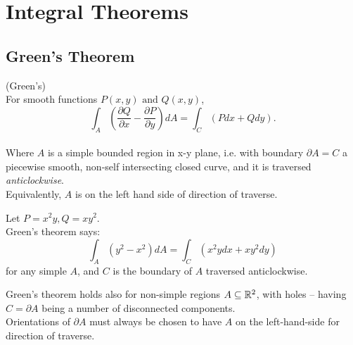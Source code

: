 \documentclass[a4paper]{article}
\begin{document}
\newpage

\section{Integral Theorems}
\subsection{Green's Theorem}
\begin{thm} (Green's)\\
	For smooth functions $P\left(x,y\right)\text{ and }Q\left(x,y\right)$,\\
	\begin{equation*}
	\int_{A} \left(\frac{\partial Q}{\partial x}-\frac{\partial P}{\partial y}\right) dA = \int_{C} \left(Pdx+Qdy\right).
	\end{equation*}\\
	Where $A$ is a simple bounded region in x-y plane, i.e. with boundary $\partial A=C$ a piecewise smooth, non-self intersecting closed curve, and it is traversed \emph{anticlockwise}.\\
	Equivalently, $A$ is on the left hand side of direction of traverse.
\end{thm}

\begin{eg}
	Let $P=x^2 y, Q=xy^2$.\\
	Green's theorem says:\\
	\begin{equation*}
	\int_{A} \left(y^2-x^2\right)dA = \int_{C}\left(x^2 ydx+xy^2 dy\right)
	\end{equation*}
	for any simple $A$, and $C$ is the boundary of $A$ traversed anticlockwise.\\
\end{eg}

\begin{rem}
Green's theorem holds also for non-simple regions $A\subseteq \mathbb{R}^2$, with holes -- having $C=\partial A$ being a number of disconnected components.\\
Orientations of $\partial A$ must always be chosen to have $A$ on the left-hand-side for direction of traverse.\\
\end{rem}
\end{document}
